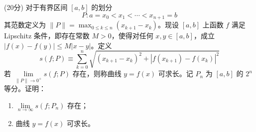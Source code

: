 \documentclass[loose]{ExBook}
\begin{document}
\begin{qitems}
    \begin{bbox}
        \qitem (20分) 对于有界区间 \([a, b]\) 的划分
        \[P : a = x_0 < x_1 < \cdots < x_{n+1} = b\]
        其范数定义为 \(\|P\| = \max_{0 \leq k \leq n} (x_{k+1} - x_k)\)。现设 \([a, b]\) 上函数 \(f\) 满足 Lipschitz 条件，即存在常数 \(M > 0\)，使得对任何 \(x, y \in [a, b]\)，成立 \(|f(x) - f(y)| \leq M |x - y|\)。定义
        \[s(f; P) \equiv \sum_{k=0}^n \sqrt{(x_{k+1} - x_k)^2 + |f(x_{k+1}) - f(x_k)|^2}\]
        若 \(\lim\limits_{\|P\|\to 0^+} s(f; P)\) 存在，则称曲线 \(y = f(x)\) 可求长。记 \(P_n\) 为 \([a, b]\) 的 \(2^n\) 等分。证明：
        
        \begin{enumerate}[label=(\arabic*)]
            \item \(\lim\limits_{n \to \infty} s(f; P_n)\) 存在；
            \item 曲线 \(y = f(x)\) 可求长。
        \end{enumerate}
    \end{bbox}
\end{qitems}
\end{document}
